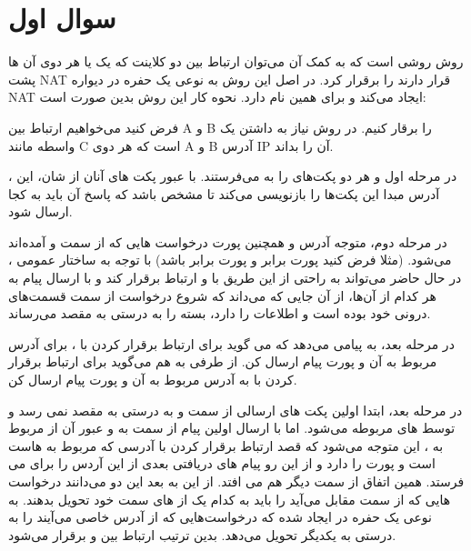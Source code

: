 \documentclass[12pt]{article}
\begin{document}
	\KashidaOff
	
	\section{سوال اول}


روش  روشی است که به کمک آن می‌توان ارتباط بین دو کلاینت که یک یا هر دوی آن ها پشت NAT قرار دارند را برقرار کرد. در اصل این روش به نوعی یک حفره در دیواره NAT ایجاد می‌کند و برای همین  نام دارد. نحوه کار این روش بدین صورت است:

فرض کنید می‌خواهیم ارتباط بین A و B را برقار کنیم. در روش  نیاز به داشتن یک واسطه مانند C است که هر دوی A و B آدرس IP آن را بداند.

در مرحله اول  و  هر دو پکت‌های  را به  می‌فرستند. با عبور پکت های آنان از  شان، این ، آدرس  مبدا این پکت‌ها را بازنویسی می‌کند تا مشخص باشد که پاسخ آن باید به کجا ارسال شود.

در مرحله دوم،  متوجه  آدرس و همچنین پورت درخواست هایی که از سمت  و  آمده‌اند می‌شود. (مثلا فرض کنید پورت  برابر  و پورت  برابر باشد) با توجه به ساختار عمومی ، در حال حاضر می‌تواند به راحتی از این طریق با  و  ارتباط برقرار کند و با ارسال پیام به  هر کدام از آن‌ها، از آن جایی که  می‌داند که شروع درخواست از سمت قسمت‌های درونی خود بوده است و اطلاعات را دارد، بسته را به درستی به مقصد می‌رساند.

در مرحله بعد،  به  پیامی می‌دهد که می گوید برای ارتباط برقرار کردن با ، برای آدرس مربوط به  آن و پورت  پیام ارسال کن. از طرفی به هم می‌گوید برای ارتباط برقرار کردن با  به آدرس  مربوط به  آن و پورت  پیام ارسال کن.

در مرحله بعد، ابتدا اولین پکت های ارسالی از سمت  و  به درستی به مقصد نمی رسد و توسط های مربوطه  می‌شود. اما با ارسال اولین پیام از سمت  به  و عبور آن از  مربوط به ، این متوجه می‌شود که  قصد ارتباط برقرار کردن با  آدرسی که مربوط به  هاست  است و پورت  را دارد و از این رو پیام های دریافتی بعدی از این آردس را برای  می فرستد. همین اتفاق از سمت  دیگر هم می افتد. از این به بعد این دو  می‌دانند درخواست هایی که از سمت مقابل می‌آید را باید به کدام یک از  های سمت خود تحویل بدهند. به نوعی یک حفره در  ایجاد شده که درخواست‌هایی که از آدرس خاصی می‌آیند را به درستی به یکدیگر تحویل می‌دهد. بدین ترتیب ارتباط  بین  و  برقرار می‌شود.
\end{document}
